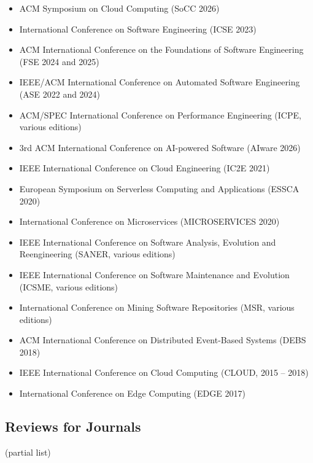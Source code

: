 \documentclass[paper=letter,fontsize=11pt]{scrartcl} %
\begin{document}
\begin{itemize}
  \item ACM Symposium on Cloud Computing (SoCC 2026)
  \item International Conference on Software Engineering (ICSE 2023)
  \item ACM International Conference on the Foundations of Software Engineering (FSE 2024 and 2025)
  \item IEEE/ACM International Conference on Automated Software Engineering (ASE 2022 and 2024)
	\item ACM/SPEC International Conference on Performance Engineering (ICPE, various editions)
  \item 3rd ACM International Conference on AI-powered Software (AIware 2026)
  \item IEEE International Conference on Cloud Engineering (IC2E 2021)
	\item European Symposium on Serverless Computing and Applications (ESSCA 2020)
	\item International Conference on Microservices (MICROSERVICES 2020)
	\item IEEE International Conference on Software Analysis, Evolution and Reengineering (SANER, various editions)
	\item IEEE International Conference on Software Maintenance and Evolution (ICSME, various editions)
	\item International Conference on Mining Software Repositories (MSR, various editions)
  \item ACM International Conference on Distributed Event-Based Systems (DEBS 2018)
	\item IEEE International Conference on Cloud Computing (CLOUD, 2015 -- 2018)
	\item International Conference on Edge Computing (EDGE 2017)
\end{itemize}

\subsection*{Reviews for Journals}

(partial list)
\end{document}
